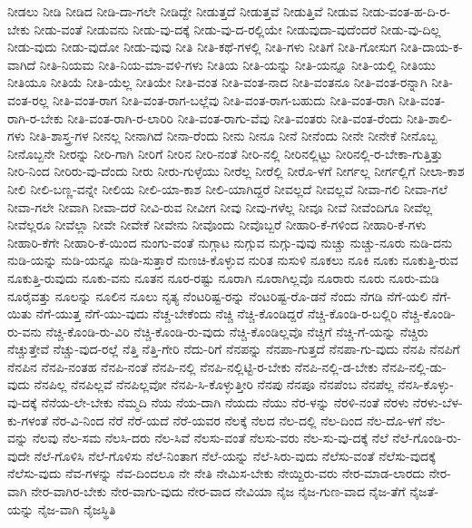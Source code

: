 {ನೀಡಲು
ನೀಡಿ
ನೀಡಿದ
ನೀಡಿ-ದಾ-ಗಲೇ
ನೀಡಿದ್ದೇ
ನೀಡುತ್ತದೆ
ನೀಡುತ್ತವೆ
ನೀಡುತ್ತಿವೆ
ನೀಡುವ
ನೀಡು-ವಂತ-ಹ-ದಿ-ರ-ಬೇಕು
ನೀಡು-ವಂತೆ
ನೀಡುವನು
ನೀಡು-ವು-ದಕ್ಕೆ
ನೀಡು-ವು-ದ-ರಲ್ಲಿಯೇ
ನೀಡುವುದಾ-ವುದೆಂದರೆ
ನೀಡು-ವು-ದಿಲ್ಲ
ನೀಡು-ವುದು
ನೀಡು-ವುದೋ
ನೀಡು-ವುವು
ನೀತಿ
ನೀತಿ-ಕಥೆ-ಗಳಲ್ಲಿ
ನೀತಿ-ಗಳು
ನೀತಿಗೆ
ನೀತಿ-ಗೋಸುಗ
ನೀತಿ-ದಾಯ-ಕ-ವಾಗಿದೆ
ನೀತಿ-ನಿಯಮ
ನೀತಿ-ನಿಯ-ಮಾ-ವಳಿ-ಗಳು
ನೀತಿಯ
ನೀತಿ-ಯನ್ನು
ನೀತಿ-ಯನ್ನೂ
ನೀತಿ-ಯಲ್ಲಿ
ನೀತಿಯು
ನೀತಿಯೂ
ನೀತಿಯೆ
ನೀತಿ-ಯೆಲ್ಲ
ನೀತಿಯೇ
ನೀತಿ-ವಂತ
ನೀತಿ-ವಂತ-ನಾದ
ನೀತಿ-ವಂತನೂ
ನೀತಿ-ವಂತ-ರನ್ನಾಗಿ
ನೀತಿ-ವಂತ-ರಲ್ಲ
ನೀತಿ-ವಂತ-ರಾಗ
ನೀತಿ-ವಂತ-ರಾಗ-ಬಲ್ಲೆವು
ನೀತಿ-ವಂತ-ರಾಗ-ಬಹುದು
ನೀತಿ-ವಂತ-ರಾಗಿ
ನೀತಿ-ವಂತ-ರಾಗಿ-ರ-ಬೇಕು
ನೀತಿ-ವಂತ-ರಾಗಿ-ರ-ಲಾರಿರಿ
ನೀತಿ-ವಂತ-ರಾಗು-ವೆವು
ನೀತಿ-ವಂತರು
ನೀತಿ-ವಂತ-ರೆಂದು
ನೀತಿ-ಶಾಲಿ-ಗಳು
ನೀತಿ-ಶಾಸ್ತ್ರ-ಗಳ
ನೀನಲ್ಲ
ನೀನಾಗಿದೆ
ನೀನಾ-ರೆಂದು
ನೀನು
ನೀನೂ
ನೀನೆ
ನೀನೆಂದು
ನೀನೇ
ನೀನೇಕೆ
ನೀನೊಬ್ಬ
ನೀನೊಬ್ಬನೇ
ನೀರನ್ನು
ನೀರಿ-ಗಾಗಿ
ನೀರಿಗೆ
ನೀರಿನ
ನೀರಿ-ನಂತೆ
ನೀರಿ-ನಲ್ಲಿ
ನೀರಿನಲ್ಲಿಟ್ಟು
ನೀರಿನಲ್ಲಿ-ರ-ಬೇಕಾ-ಗುತ್ತಿತ್ತು
ನೀರಿ-ನಿಂದ
ನೀರಿರು-ವು-ದೆಂದು
ನೀರು
ನೀರು-ಗುಳ್ಳೆಯು
ನೀರೆಲ್ಲ
ನೀರೆಲ್ಲಿ
ನೀರೊ-ಳಗೆ
ನೀರ್ಗಲ್ಲ
ನೀರ್ಗಲ್ಲಿಗೆ
ನೀಲಾ-ಕಾಶ
ನೀಲಿ
ನೀಲಿ-ಬಣ್ಣ-ವನ್ನೇ
ನೀಲಿಯ
ನೀಲಿ-ಯಾ-ಕಾಶ
ನೀಲಿ-ಯಾಗಿದ್ದರೆ
ನೀವಲ್ಲದೆ
ನೀವಲ್ಲವೆ
ನೀವಾ-ಗಲಿ
ನೀವಾ-ಗಲೆ
ನೀವಾ-ಗಲೇ
ನೀವಾಗಿ
ನೀವಾ-ದರೆ
ನೀವಿ-ರುವ
ನೀವೀಗ
ನೀವು
ನೀವು-ಗಳೆಲ್ಲ
ನೀವೂ
ನೀವೆ
ನೀವೆಂದಿಗೂ
ನೀವೆಲ್ಲ
ನೀವೆಲ್ಲರೂ
ನೀವೆಲ್ಲಾ
ನೀವೇ
ನೀವೇಕೆ
ನೀವೇನು
ನೀವೊಂದು
ನೀವೊಬ್ಬರೆ
ನೀಹಾರಿ-ಕೆ-ಗಳಿಂದ
ನೀಹಾರಿ-ಕೆ-ಗಳು
ನೀಹಾರಿ-ಕೆಗೇ
ನೀಹಾರಿ-ಕೆ-ಯಿಂದ
ನುಂಗು-ವಂತೆ
ನುಗ್ಗಾಟ
ನುಗ್ಗುವ
ನುಗ್ಗು-ವುವು
ನುಚ್ಚು
ನುಚ್ಚು-ನೂರು
ನುಡಿ-ದನು
ನುಡಿ-ಯನ್ನು
ನುಡಿ-ಯನ್ನೂ
ನುಡಿ-ಸುತ್ತಾರೆ
ನುಣಚಿ-ಕೊಳ್ಳುವ
ನುರಿತ
ನುಸುಳಿ
ನೂಕಲು
ನೂಕಿ
ನೂಕು
ನೂಕುತ್ತಿ-ರುವ
ನೂಕುತ್ತಿ-ರುವುದು
ನೂಕು-ವನು
ನೂತನ
ನೂರ-ರಷ್ಟು
ನೂರಾಗಿ
ನೂರಾಗಿಲ್ಲವೊ
ನೂರಾರು
ನೂರು
ನೂರು-ಮಡಿ
ನೂರೈವತ್ತು
ನೂಲನ್ನು
ನೂಲಿನ
ನೂಲು
ನೃತ್ಯ
ನೆಂಟರಿಷ್ಟ-ರನ್ನು
ನೆಂಟರಿಷ್ಟ-ರೊ-ಡನೆ
ನೆಂದು
ನೆಗಡಿ
ನೆಗೆ-ಯಲಿ
ನೆಗೆ-ಯಿತು
ನೆಗೆ-ಯುತ್ತ
ನೆಗೆ-ಯು-ವುದು
ನೆಚ್ಚ-ಬೇಕೆಂದು
ನೆಚ್ಚಿ
ನೆಚ್ಚಿ-ಕೊಂಡಿದ್ದರೆ
ನೆಚ್ಚಿ-ಕೊಂಡಿ-ರ-ಬಲ್ಲಿರಿ
ನೆಚ್ಚಿ-ಕೊಂಡಿ-ರು-ವನು
ನೆಚ್ಚಿ-ಕೊಂಡಿ-ರು-ವಿರಿ
ನೆಚ್ಚಿ-ಕೊಂಡಿ-ರು-ವುದು
ನೆಚ್ಚಿ-ಕೊಂಡಿಲ್ಲವೊ
ನೆಚ್ಚಿಗೆ
ನೆಚ್ಚಿ-ಗೆ-ಯನ್ನು
ನೆಚ್ಚಿರು
ನೆಚ್ಚುತ್ತೇವೆ
ನೆಚ್ಚು-ವುದ-ರಲ್ಲೆ
ನೆತ್ತಿ
ನೆತ್ತಿ-ಗೇರಿ
ನೆದು-ರಿಗೆ
ನೆನಪನ್ನು
ನೆನಪಾ-ಗುತ್ತದೆ
ನೆನಪಾ-ಗು-ವುದು
ನೆನಪಿ
ನೆನಪಿಗೆ
ನೆನಪಿನ
ನೆನಪಿ-ನಂತಹ
ನೆನಪಿ-ನಂತೆ
ನೆನಪಿ-ನಲ್ಲಿ
ನೆನಪಿ-ನಲ್ಲಿಟ್ಟಿ-ರ-ಬೇಕು
ನೆನಪಿ-ನಲ್ಲಿ-ಡ-ಬೇಕು
ನೆನಪಿ-ನಲ್ಲಿ-ಡು-ವುದು
ನೆನಪಿಲ್ಲ
ನೆನಪಿಲ್ಲವೆ
ನೆನಪಿಲ್ಲವೋ
ನೆನಪಿ-ಸಿ-ಕೊಳ್ಳುತ್ತೀರಿ
ನೆನಪು
ನೆನಪೂ
ನೆನಪೆಂಬ
ನೆನಪೆಲ್ಲ
ನೆನಸಿ-ಕೊಳ್ಳು-ವು-ದಕ್ಕೆ
ನೆನೆಯ-ಲೇ-ಬೇಕು
ನೆಮ್ಮದಿ
ನೆಯ
ನೆಯ-ದಾಗಿ
ನೆಯದು
ನೆಯು
ನೆರ-ಳನ್ನು
ನೆರಳಿ-ನಂತೆ
ನೆರಳು
ನೆರಳು-ಬೆಳ-ಕು-ಗಳಂತೆ
ನೆರ-ವಿ-ನಿಂದ
ನೆರೆ
ನೆರೆ-ಯದೆ
ನೆರೆ-ಯವರ
ನೆಲಕ್ಕೆ
ನೆಲದ
ನೆಲ-ದಲ್ಲಿ
ನೆಲ-ದಿಂದ
ನೆಲ-ದೊ-ಳಗೆ
ನೆಲ-ವನ್ನು
ನೆಲವು
ನೆಲ-ಸಮ
ನೆಲಸಿ-ದರು
ನೆಲ-ಸಿವೆ
ನೆಲಸು-ವಂತೆ
ನೆಲಸು-ವರು
ನೆಲ-ಸು-ವು-ದಕ್ಕೆ
ನೆಲೆ
ನೆಲೆ-ಗೊಂಡಿ-ರು-ವುದೇ
ನೆಲೆ-ಗೊಳಿಸಿ
ನೆಲೆ-ಗೊಳಿಸು
ನೆಲೆ-ನಿಂತಾಗ
ನೆಲೆ-ಯನ್ನು
ನೆಲೆ-ಸಿರು-ವುದು
ನೆಲೆಸು-ವಂತೆ
ನೆಲೆಸು-ವುದಕ್ಕೆ
ನೆಲೆಸು-ವುದು
ನೆವ-ಗಳನ್ನು
ನೆವ-ದಿಂದಲೂ
ನೇ
ನೇತಿ
ನೇಮಿಸ-ಬೇಕು
ನೇಯ್ದಿರು-ವರು
ನೇರ-ಮಾಡ-ಲಾರದು
ನೇರ-ವಾಗಿ
ನೇರ-ವಾಗಿರ-ಬೇಕು
ನೇರ-ವಾಗು-ವುದು
ನೇರ-ವಾದ
ನೇವಿಯಾ
ನೈಜ
ನೈಜ-ಗುಣ-ವಾದ
ನೈಜ-ತೆಗೆ
ನೈಜತೆ-ಯನ್ನು
ನೈಜ-ವಾಗಿ
ನೈಜಸ್ಥಿತಿ
}
